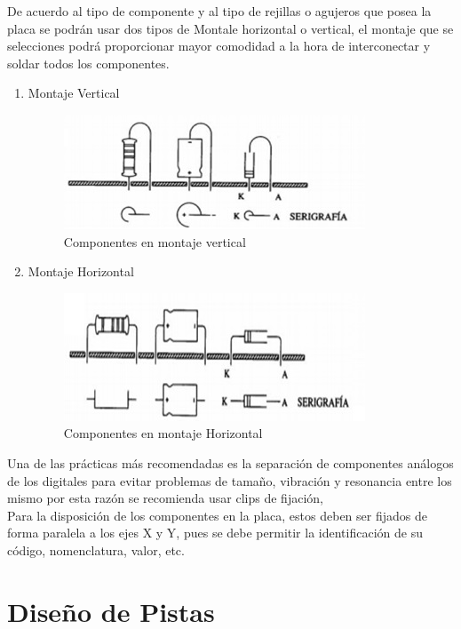 \documentclass[a4paper,12pt,twoside]{proyectotanquesecci}
\begin{document}
De acuerdo al tipo de componente  y al tipo de rejillas o agujeros que posea la placa se podrán usar dos tipos de Montale horizontal o vertical, el montaje que se selecciones podrá proporcionar mayor comodidad a la hora de  interconectar y soldar todos los componentes.

\begin{enumerate}
\item	Montaje Vertical
\begin{figure}[h]
  \centering
  \includegraphics[scale=1.0]{MVERTICAL.jpg}
  \renewcommand{\figurename}{Fig.}
  \caption{Componentes en montaje vertical}
  \label{Componentes en montaje vertical}
  \end{figure}
\item	Montaje Horizontal
\begin{figure}[h]
  \centering
  \includegraphics[scale=1.0]{MHORIZONTAL.jpg}
  \renewcommand{\figurename}{Fig.}
  \caption{Componentes en montaje Horizontal}
  \label{Componentes en montaje Horizontal}
  \end{figure}
\end{enumerate}

Una de las prácticas más recomendadas es la separación de componentes análogos de los digitales para evitar problemas  de tamaño, vibración  y resonancia entre los mismo por esta razón se recomienda usar clips de fijación,\\

Para la disposición de los componentes en la placa, estos deben ser fijados  de forma paralela a los ejes X y Y,  pues se debe permitir la identificación  de su código, nomenclatura, valor, etc.

\section{Diseño de Pistas}
\end{document}

